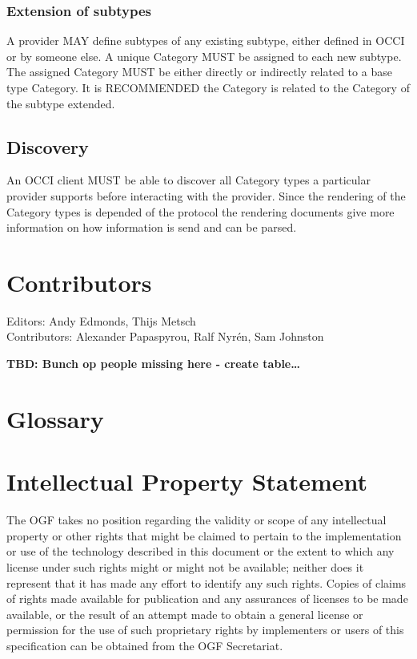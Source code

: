 \documentclass[10pt,a4paper,british]{article}
\begin{document}
\subsubsection{Extension of subtypes}
A provider MAY define subtypes of any existing subtype, either defined
in OCCI or by someone else. A unique Category MUST be assigned to each
new subtype. The assigned Category MUST be either directly or
indirectly related to a base type Category. It is RECOMMENDED the
Category is related to the Category of the subtype extended.

\subsection{Discovery}
An OCCI client MUST be able to discover all Category types a
particular provider supports before interacting with the
provider. Since the rendering of the Category types is depended of the
protocol the rendering documents give more information on how
information is send and can be parsed.

\section{Contributors}
Editors: Andy Edmonds, Thijs Metsch \\
Contributors: Alexander Papaspyrou, Ralf Nyrén, Sam Johnston

\textbf{TBD: Bunch op people missing here - create table\ldots}

\section{Glossary}
\label{sec:glossary}



\section{Intellectual Property Statement}
The OGF takes no position regarding the validity or scope of any
intellectual property or other rights that might be claimed to pertain
to the implementation or use of the technology described in this
document or the extent to which any license under such rights might or
might not be available; neither does it represent that it has made any
effort to identify any such rights. Copies of claims of rights made
available for publication and any assurances of licenses to be made
available, or the result of an attempt made to obtain a general
license or permission for the use of such proprietary rights by
implementers or users of this specification can be obtained from the
OGF Secretariat.
\end{document}
